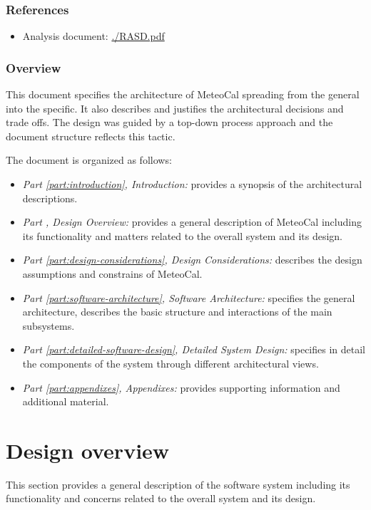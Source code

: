 \documentclass[10pt,a4paper,titlepage]{article}
\begin{document}
\section{References}
\begin{itemize}
\item Analysis document: \url{./RASD.pdf}
\end{itemize}

\section{Overview}
This document specifies the architecture of MeteoCal spreading from the general into the specific. It also describes and justifies the architectural decisions and trade offs.
The design was guided by a top-down process approach and the document structure reflects this tactic.

The document is organized as follows:
\begin{itemize}
\item \emph{Part \ref{part:introduction}, Introduction:} provides a synopsis of the architectural descriptions.
\item \emph{Part \ref{part:design-overview}, Design Overview:} provides a general description of MeteoCal including its functionality and matters related to the overall system and its design.
\item \emph{Part \ref{part:design-considerations}, Design Considerations:} describes the design assumptions and constrains of MeteoCal.
\item \emph{Part \ref{part:software-architecture}, Software Architecture:} specifies the general architecture, describes the basic structure and interactions of the main subsystems.
\item \emph{Part \ref{part:detailed-software-design}, Detailed System Design:} specifies in detail the components of the system through different architectural views.
\item \emph{Part \ref{part:appendixes}, Appendixes:} provides supporting information and additional material.
\end{itemize}

\clearpage
\part{Design overview}
\label{part:design-overview}
This section provides a general description of the software system including its functionality and concerns related to the overall system and its design.
\end{document}
